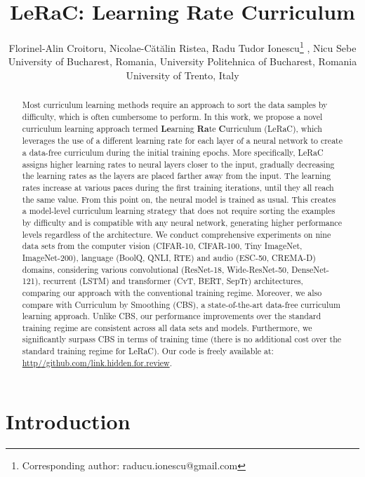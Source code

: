 \documentclass[10pt,twocolumn,letterpaper]{article}
\title{\vspace{-0.7cm}LeRaC: Learning Rate Curriculum}
\author{Florinel-Alin Croitoru, Nicolae-C\u{a}t\u{a}lin Ristea, Radu Tudor Ionescu\thanks{Corresponding author: raducu.ionescu@gmail.com} , Nicu Sebe\\
University of Bucharest, Romania, University Politehnica of Bucharest, Romania\\ 
University of Trento, Italy\vspace*{-0.3cm}
}
\begin{document}
\maketitle

\begin{abstract}
\vspace{-0.3cm}
Most curriculum learning methods require an approach to sort the data samples by difficulty, which is often cumbersome to perform. In this work, we propose a novel curriculum learning approach termed \textbf{Le}arning \textbf{Ra}te \textbf{C}urriculum (LeRaC), which leverages the use of a different learning rate for each layer of a neural network to create a data-free curriculum during the initial training epochs. More specifically, LeRaC assigns higher learning rates to neural layers closer to the input, gradually decreasing the learning rates as the layers are placed farther away from the input. The learning rates increase at various paces during the first training iterations, until they all reach the same value. From this point on, the neural model is trained as usual. This creates a model-level curriculum learning strategy that does not require sorting the examples by difficulty and is compatible with any neural network, generating higher performance levels regardless of the architecture. We conduct comprehensive experiments on nine data sets from the computer vision (CIFAR-10, CIFAR-100, Tiny ImageNet, ImageNet-200), language (BoolQ, QNLI, RTE) and audio (ESC-50, CREMA-D) domains, considering various convolutional (ResNet-18, Wide-ResNet-50, DenseNet-121), recurrent (LSTM) and transformer (CvT, BERT, SepTr) architectures, comparing our approach with the conventional training regime. Moreover, we also compare with Curriculum by Smoothing (CBS), a state-of-the-art data-free curriculum learning approach. Unlike CBS, our performance improvements over the standard training regime are consistent across all data sets and models. Furthermore, we significantly surpass CBS in terms of training time (there is no additional cost over the standard training regime for LeRaC). Our code is freely available at: \url{http//github.com/link.hidden.for.review}.
\vspace{-0.6cm}
\end{abstract}

\setlength{\abovedisplayskip}{2.5pt}
\setlength{\belowdisplayskip}{2.5pt}

\section{Introduction}
\end{document}
